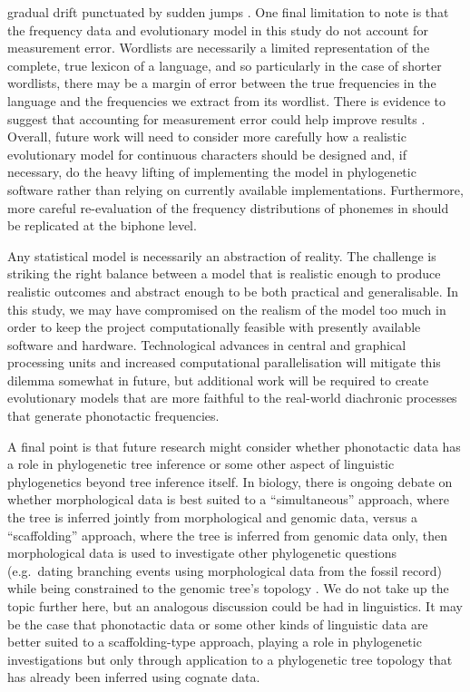 gradual drift punctuated by sudden jumps \autocite{uyeda_rethinking_2018}. One final limitation to note is that the frequency data and evolutionary model in this study do not account for measurement error. Wordlists are necessarily a limited representation of the complete, true lexicon of a language, and so particularly in the case of shorter wordlists, there may be a margin of error between the true frequencies in the language and the frequencies we extract from its wordlist. There is evidence to suggest that accounting for measurement error could help improve results \autocite{round_clouded_2019}. Overall, future work will need to consider more carefully how a realistic evolutionary model for continuous characters should be designed and, if necessary, do the heavy lifting of implementing the model in phylogenetic software rather than relying on currently available implementations. Furthermore, more careful re-evaluation of the frequency distributions of phonemes in \textcite{macklin-cordes_re-evaluating_2020} should be replicated at the biphone level.

Any statistical model is necessarily an abstraction of reality. The challenge is striking the right balance between a model that is realistic enough to produce realistic outcomes and abstract enough to be both practical and generalisable. In this study, we may have compromised on the realism of the model too much in order to keep the project computationally feasible with presently available software and hardware. Technological advances in central and graphical processing units and increased computational parallelisation \autocite[e.g.][]{holbrook_massive_2020} will mitigate this dilemma somewhat in future, but additional work will be required to create evolutionary models that are more faithful to the real-world diachronic processes that generate phonotactic frequencies.

A final point is that future research might consider whether phonotactic data has a role in phylogenetic tree inference or some other aspect of linguistic phylogenetics beyond tree inference itself. In biology, there is ongoing debate on whether morphological data is best suited to a ``simultaneous'' approach, where the tree is inferred jointly from morphological and genomic data, versus a ``scaffolding'' approach, where the tree is inferred from genomic data only, then morphological data is used to investigate other phylogenetic questions (e.g.~dating branching events using morphological data from the fossil record) while being constrained to the genomic tree's topology \autocites{de_queiroz_including_1996}{lee_morphological_2015}. We do not take up the topic further here, but an analogous discussion could be had in linguistics. It may be the case that phonotactic data or some other kinds of linguistic data are better suited to a scaffolding-type approach, playing a role in phylogenetic investigations but only through application to a phylogenetic tree topology that has already been inferred using cognate data.

